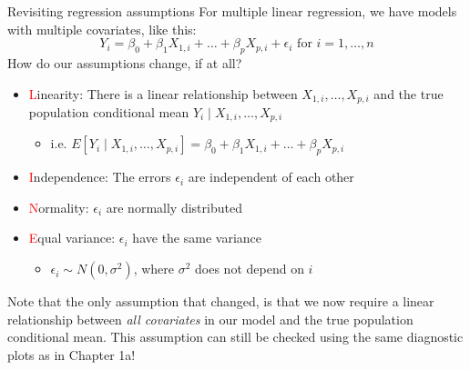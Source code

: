 \documentclass[10pt,t]{beamer}
\begin{document}
\begin{frame}{Revisiting regression assumptions}
For multiple linear regression, we have models with multiple covariates, like this:
$$
Y_i = \beta_0 + \beta_1 X_{1,i} + \dots + \beta_p X_{p,i} + \epsilon_i \text{ for } i = 1, \dots, n
$$
How do our assumptions change, if at all? \pause

\vspace{0.3cm}

\begin{itemize}
	\item \textcolor{red}{L}inearity: There is a linear relationship between \color{cyan}$X_{1,i}, \dots, X_{p,i}$ \color{black} and the true population conditional mean \color{cyan}$Y_i \mid X_{1,i}, \dots, X_{p,i}$
	\begin{itemize}
		\item i.e. \color{cyan} $E[Y_i \mid X_{1,i}, \dots, X_{p,i}] = \beta_0 + \beta_1 X_{1,i} + \dots + \beta_p X_{p,i}$  \color{black}
	\end{itemize} 
	\item \textcolor{red}{I}\color{black}ndependence: The errors $\epsilon_i$ are independent of each other
	\item \textcolor{red}{N}ormality: $\epsilon_i$ are normally distributed
	\item \textcolor{red}{E}qual variance: $\epsilon_i$ have the same variance
	\begin{itemize}
		\item $\epsilon_i \sim N(0, \sigma^2)$, where $\sigma^2$ does not depend on $i$
	\end{itemize}
\end{itemize}

\vspace{0.2cm}

Note that the only assumption that changed, is that we now require a linear relationship between \textit{all covariates} in our model and the true population conditional mean. This assumption can still be checked using the same diagnostic plots as in Chapter 1a!

\end{frame}
\end{document}
